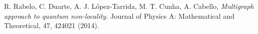 \documentclass[letterpaper]{article}
\begin{document}
\begin{thebibliography}{}
      R. Rabelo, C. Duarte, A. J.  López-Tarrida, M. T. Cunha, A. Cabello, 
         {\em Multigraph approach to quantum non-locality.}
         Journal of Physics A: Mathematical and Theoretical, 47, 424021 (2014).

\end{thebibliography}
\end{document}
